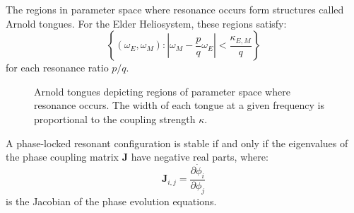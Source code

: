 \begin{definition}
The regions in parameter space where resonance occurs form structures called Arnold tongues. For the Elder Heliosystem, these regions satisfy:
\begin{equation}
\left\{(\omega_E, \omega_M) : \left|\omega_M - \frac{p}{q}\omega_E\right| < \frac{\kappa_{E,M}}{q} \right\}
\end{equation}
for each resonance ratio $p/q$.
\end{definition}

\begin{figure}[ht]
\centering
{}
\caption{Arnold tongues depicting regions of parameter space where resonance occurs. The width of each tongue at a given frequency is proportional to the coupling strength $\kappa$.}
\label{fig:arnold_tongues}
\end{figure}

\begin{lemma}
A phase-locked resonant configuration is stable if and only if the eigenvalues of the phase coupling matrix $\mathbf{J}$ have negative real parts, where:
\begin{equation}
\mathbf{J}_{i,j} = \frac{\partial \dot{\phi}_i}{\partial \phi_j}
\end{equation}
is the Jacobian of the phase evolution equations.
\end{lemma}

